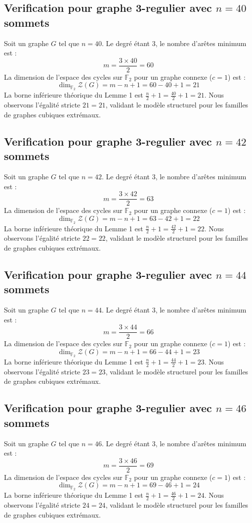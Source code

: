 \documentclass[11pt,a4paper]{article}
\begin{document}
\subsection{Verification pour graphe 3-regulier avec $n=40$ sommets}
Soit un graphe $G$ tel que $n = 40$. Le degré étant 3, le nombre d'arêtes minimum est :
$$ m = \frac{3 \times 40}{2} = 60 $$
La dimension de l'espace des cycles sur $\mathbb{F}_2$ pour un graphe connexe ($c=1$) est :
$$ \dim_{\mathbb{F}_2} \mathcal{Z}(G) = m - n + 1 = 60 - 40 + 1 = 21 $$
La borne inférieure théorique du Lemme 1 est $\frac{n}{2} + 1 = \frac{40}{2} + 1 = 21$.
Nous observons l'égalité stricte $21 = 21$, validant le modèle structurel pour les familles de graphes cubiques extrémaux.

\subsection{Verification pour graphe 3-regulier avec $n=42$ sommets}
Soit un graphe $G$ tel que $n = 42$. Le degré étant 3, le nombre d'arêtes minimum est :
$$ m = \frac{3 \times 42}{2} = 63 $$
La dimension de l'espace des cycles sur $\mathbb{F}_2$ pour un graphe connexe ($c=1$) est :
$$ \dim_{\mathbb{F}_2} \mathcal{Z}(G) = m - n + 1 = 63 - 42 + 1 = 22 $$
La borne inférieure théorique du Lemme 1 est $\frac{n}{2} + 1 = \frac{42}{2} + 1 = 22$.
Nous observons l'égalité stricte $22 = 22$, validant le modèle structurel pour les familles de graphes cubiques extrémaux.

\subsection{Verification pour graphe 3-regulier avec $n=44$ sommets}
Soit un graphe $G$ tel que $n = 44$. Le degré étant 3, le nombre d'arêtes minimum est :
$$ m = \frac{3 \times 44}{2} = 66 $$
La dimension de l'espace des cycles sur $\mathbb{F}_2$ pour un graphe connexe ($c=1$) est :
$$ \dim_{\mathbb{F}_2} \mathcal{Z}(G) = m - n + 1 = 66 - 44 + 1 = 23 $$
La borne inférieure théorique du Lemme 1 est $\frac{n}{2} + 1 = \frac{44}{2} + 1 = 23$.
Nous observons l'égalité stricte $23 = 23$, validant le modèle structurel pour les familles de graphes cubiques extrémaux.

\subsection{Verification pour graphe 3-regulier avec $n=46$ sommets}
Soit un graphe $G$ tel que $n = 46$. Le degré étant 3, le nombre d'arêtes minimum est :
$$ m = \frac{3 \times 46}{2} = 69 $$
La dimension de l'espace des cycles sur $\mathbb{F}_2$ pour un graphe connexe ($c=1$) est :
$$ \dim_{\mathbb{F}_2} \mathcal{Z}(G) = m - n + 1 = 69 - 46 + 1 = 24 $$
La borne inférieure théorique du Lemme 1 est $\frac{n}{2} + 1 = \frac{46}{2} + 1 = 24$.
Nous observons l'égalité stricte $24 = 24$, validant le modèle structurel pour les familles de graphes cubiques extrémaux.
\end{document}
